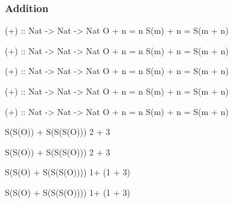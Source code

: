 \documentclass{beamer}
\newcommand{\ca}[1]{{\color{blue}#1}}
\newcommand{\cb}[1]{{\color{violet}#1}}
\begin{document}
\begin{frame}[t,fragile]
    \frametitle {Addition}

\begin{overprint}

\begin{semiverbatim}
(+) :: Nat -> Nat -> Nat
O    + n = n
S(m) + n = S(m + n)
\end{semiverbatim}

\begin{semiverbatim}
(+) :: Nat -> Nat -> Nat
\ca{O}    + \cb{n} = n
S(m) + n = S(m + n)
\end{semiverbatim}

\begin{semiverbatim}
(+) :: Nat -> Nat -> Nat
\ca{O}    + \cb{n} = \cb{n}
S(m) + n = S(m + n)
\end{semiverbatim}

\begin{semiverbatim}
(+) :: Nat -> Nat -> Nat
O    + n = n
S(\ca{m}) + \cb{n} = S(m + n)
\end{semiverbatim}

\begin{semiverbatim}
(+) :: Nat -> Nat -> Nat
O    + n = n
S(\ca{m}) + \cb{n} = S(\ca{m} + \cb{n})
\end{semiverbatim}

\end{overprint}

\vspace{10pt}

\begin{center}
\begin{overprint}

\begin{semiverbatim}
S(S(O)) + S(S(S(O)))                      2 + 3
\end{semiverbatim}

\begin{semiverbatim}
S(\ca{S(O)}) + \cb{S(S(S(O)))}                      2 + 3
\end{semiverbatim}

\begin{semiverbatim}
S(\ca{S(O)}  + \cb{S(S(S(O)))})                 1+ (1 + 3)
\end{semiverbatim}

\begin{semiverbatim}
S(S(\ca{O})  + \cb{S(S(S(O)))})                 1+ (1 + 3)
\end{semiverbatim}


\end{overprint}
\end{center}
\end{frame}
\end{document}

